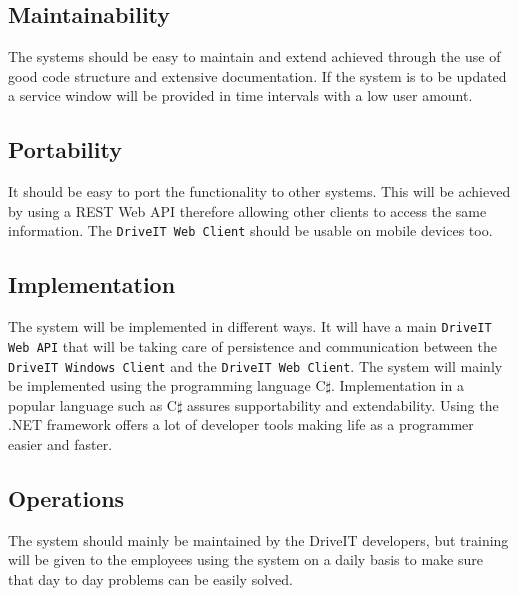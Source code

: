 \subsection{Maintainability}
The systems should be easy to maintain and extend achieved through the use of good code structure and extensive documentation. If the system is to be updated a service window will be provided in time intervals with a low user amount.

\subsection{Portability}
It should be easy to port the functionality to other systems. This will be achieved by using a REST Web API therefore allowing other clients to access the same information. The \texttt{DriveIT Web Client} should be usable on mobile devices too.

\subsection{Implementation}
The system will be implemented in different ways. It will have a main \texttt{DriveIT Web API} that will be taking care of persistence and communication between the \texttt{DriveIT Windows Client} and the \texttt{DriveIT Web Client}. The system will mainly be implemented using the programming language C$\sharp$. Implementation in a popular language such as C$\sharp$ assures supportability and extendability. 
Using the .NET framework offers a lot of developer tools making life as a programmer easier and faster.

\subsection{Operations}
The system should mainly be maintained by the DriveIT developers, but training will be given to the employees using the system on a daily basis to make sure that day to day problems can be easily solved.
